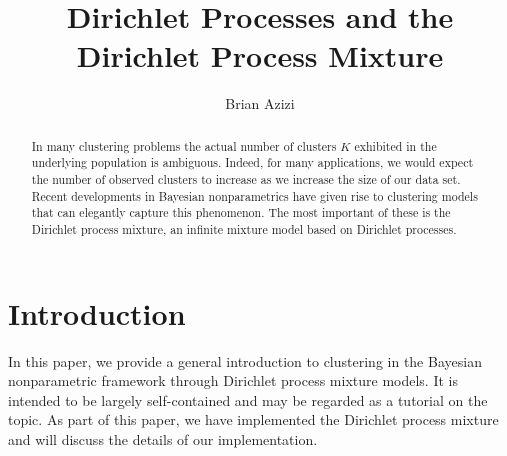 \documentclass[final,3p,times,twocolumn]{elsarticle}
\begin{document}
\begin{frontmatter}



\title{Dirichlet Processes and the Dirichlet Process Mixture}


\author{Brian Azizi}

\address{Cavendish Laboratory, Department of Physics, J J Thomson
  Avenue, Cambridge. CB3 0HE}

\begin{abstract}
In many clustering problems the actual number of clusters $K$ exhibited in the underlying population is ambiguous. 
Indeed, for many applications, we would expect the number of observed clusters to increase as we increase the size of our data set.
Recent developments in Bayesian nonparametrics have given rise to clustering models that can elegantly capture this phenomenon.
The most important of these is the Dirichlet process mixture, an infinite mixture model based on Dirichlet processes.
\end{abstract}

\end{frontmatter}


\section{Introduction}
\label{sect:Intro}
In this paper, we provide a general introduction to clustering in the Bayesian nonparametric framework through Dirichlet process mixture models. 
It is intended to be largely self-contained and may be regarded as a tutorial on the topic.
As part of this paper, we have implemented the Dirichlet process mixture and will discuss the details of our implementation.
\end{document}

